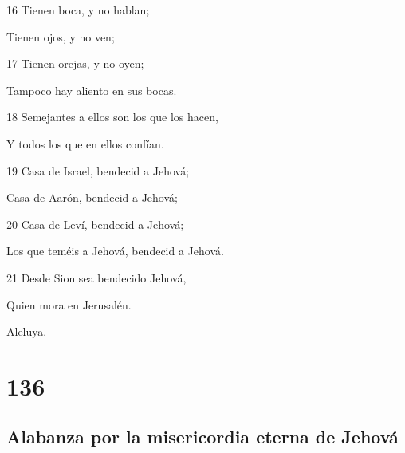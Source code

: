 \par 16 Tienen boca, y no hablan;
\par Tienen ojos, y no ven;
\par 17 Tienen orejas, y no oyen;
\par Tampoco hay aliento en sus bocas.
\par 18 Semejantes a ellos son los que los hacen,
\par Y todos los que en ellos confían.
\par 19 Casa de Israel, bendecid a Jehová;
\par Casa de Aarón, bendecid a Jehová;
\par 20 Casa de Leví, bendecid a Jehová;
\par Los que teméis a Jehová, bendecid a Jehová.
\par 21 Desde Sion sea bendecido Jehová,
\par Quien mora en Jerusalén.
\par Aleluya.

\chapter{136}

\section*{Alabanza por la misericordia eterna de Jehová}

